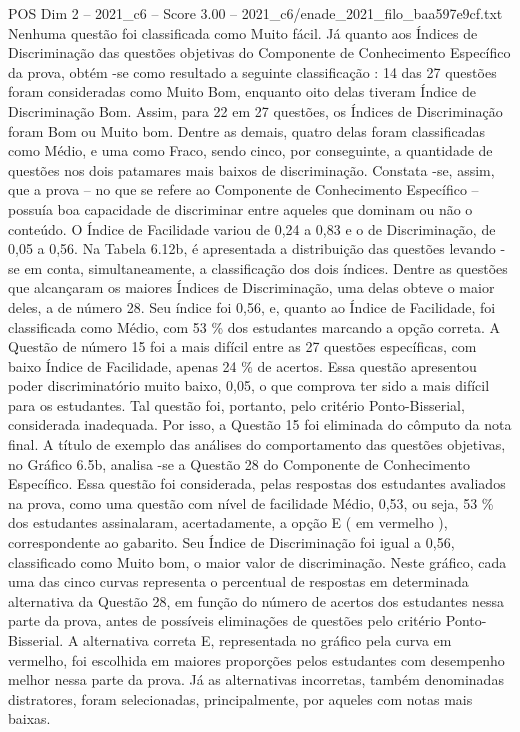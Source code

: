 \begin{textsample}{POS Dim 2 – 2021\_c6 – Score 3.00 – 2021\_c6/enade\_2021\_filo\_baa597e9cf.txt}
Nenhuma questão foi classificada como Muito fácil.
Já quanto aos Índices de Discriminação das questões objetivas do Componente de Conhecimento Específico da prova, obtém -se como resultado a seguinte classificação : 14 das 27 questões foram consideradas como Muito Bom, enquanto oito delas tiveram Índice de Discriminação Bom.
Assim, para 22 em 27 questões, os Índices de Discriminação foram Bom ou Muito bom.
Dentre as demais, quatro delas foram classificadas como Médio, e uma como Fraco, sendo cinco, por conseguinte, a quantidade de questões nos dois patamares mais baixos de discriminação.
Constata -se, assim, que a prova – no que se refere ao Componente de Conhecimento Específico – possuía boa capacidade de discriminar entre aqueles que dominam ou não o conteúdo.
O Índice de Facilidade variou de 0,24 a 0,83 e o de Discriminação, de 0,05 a 0,56.
Na Tabela 6.12b, é apresentada a distribuição das questões levando -se em conta, simultaneamente, a classificação dos dois índices.
Dentre as questões que alcançaram os maiores Índices de Discriminação, uma delas obteve o maior deles, a de número 28.
Seu índice foi 0,56, e, quanto ao Índice de Facilidade, foi classificada como Médio, com 53 \% dos estudantes marcando a opção correta.
A Questão de número 15 foi a mais difícil entre as 27 questões específicas, com baixo Índice de Facilidade, apenas 24 \% de acertos.
Essa questão apresentou poder discriminatório muito baixo, 0,05, o que comprova ter sido a mais difícil para os estudantes.
Tal questão foi, portanto, pelo critério Ponto-Bisserial, considerada inadequada.
Por isso, a Questão 15 foi eliminada do cômputo da nota final.
A título de exemplo das análises do comportamento das questões objetivas, no Gráfico 6.5b, analisa -se a Questão 28 do Componente de Conhecimento Específico.
Essa questão foi considerada, pelas respostas dos estudantes avaliados na prova, como uma questão com nível de facilidade Médio, 0,53, ou seja, 53 \% dos estudantes assinalaram, acertadamente, a opção E ( em vermelho ), correspondente ao gabarito.
Seu Índice de Discriminação foi igual a 0,56, classificado como Muito bom, o maior valor de discriminação.
Neste gráfico, cada uma das cinco curvas representa o percentual de respostas em determinada alternativa da Questão 28, em função do número de acertos dos estudantes nessa parte da prova, antes de possíveis eliminações de questões pelo critério Ponto-Bisserial.
A alternativa correta E, representada no gráfico pela curva em vermelho, foi escolhida em maiores proporções pelos estudantes com desempenho melhor nessa parte da prova.
Já as alternativas incorretas, também denominadas distratores, foram selecionadas, principalmente, por aqueles com notas mais baixas.

\end{textsample}
